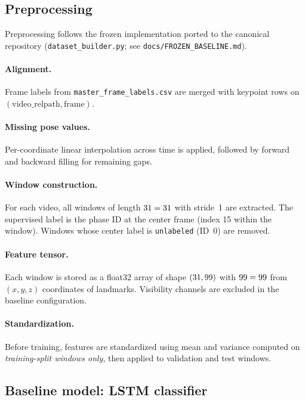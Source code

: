 \subsection{Preprocessing}
\label{sec:methods:preprocessing}

Preprocessing follows the frozen implementation ported to the canonical repository (\texttt{dataset\_builder.py}; see \texttt{docs/FROZEN\_BASELINE.md}).

\paragraph{Alignment.}
Frame labels from \texttt{master\_frame\_labels.csv} are merged with keypoint rows on $(\text{video\_relpath}, \text{frame})$.

\paragraph{Missing pose values.}
Per-coordinate linear interpolation across time is applied, followed by forward and backward filling for remaining gaps.

\paragraph{Window construction.}
For each video, all windows of length $31 = 31$ with stride~1 are extracted.
The supervised label is the phase ID at the center frame (index 15 within the window).
Windows whose center label is \texttt{unlabeled} (ID~0) are removed.

\paragraph{Feature tensor.}
Each window is stored as a float32 array of shape $(31, 99)$ with $99 = 99$ from $(x,y,z)$ coordinates of \numlandmarks{} landmarks.
Visibility channels are excluded in the baseline configuration.

\paragraph{Standardization.}
Before training, features are standardized using mean and variance computed on \emph{training-split windows only}, then applied to validation and test windows.

\subsection{Baseline model: LSTM classifier}
\label{sec:methods:lstm}

